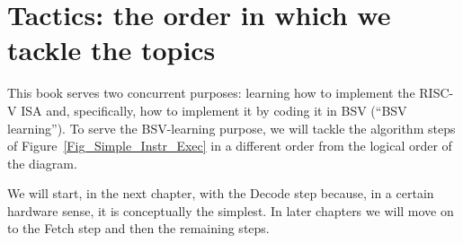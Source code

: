 
\section{Tactics: the order in which we tackle the topics}

This book serves two concurrent purposes: learning how to implement
the RISC-V ISA and, specifically, how to implement it by coding it in
BSV (``BSV learning'').  To serve the BSV-learning purpose, we will
tackle the algorithm steps of Figure~\ref{Fig_Simple_Instr_Exec} in a
different order from the logical order of the diagram.

We will start, in the next chapter, with the Decode step because, in a
certain hardware sense, it is conceptually the simplest.  In later
chapters we will move on to the Fetch step and then the remaining
steps.

